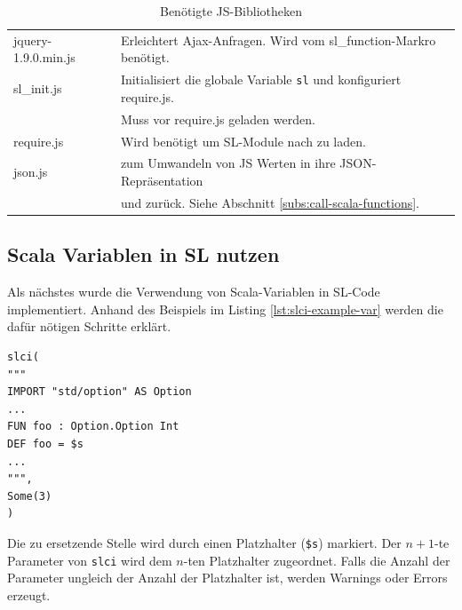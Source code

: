 \documentclass[12pt,bibtotoc]{scrreprt}
\begin{document}
\begin{table}[h]
\caption{Benötigte \ac{JS}-Bibliotheken}
\centering
\begin{tabular}{ll}
jquery-1.9.0.min.js & Erleichtert Ajax-Anfragen. Wird vom sl\_function-Markro benötigt\cite{JQuery1}.\\
sl\_init.js         & Initialisiert die globale Variable \lstinline!sl! und konfiguriert require.js. \\
                    & Muss vor require.js geladen werden.\\
require.js          & Wird benötigt um \ac{SL}-Module nach zu laden\cite{RequireJS1}.\\
json.js             & zum Umwandeln von JS Werten in ihre JSON-Repräsentation \\
                    & und zurück. Siehe Abschnitt \ref{subs:call-scala-functions}\cite{Crockford2010}.\\
\end{tabular}
\label{tab:js-libraries}
\end{table}

\subsection{Scala Variablen in SL nutzen}

Als nächstes wurde die Verwendung von Scala-Variablen in \ac{SL}-Code implementiert. Anhand des Beispiels im Listing \ref{lst:slci-example-var} werden die dafür nötigen Schritte erklärt.

\begin{lstlisting}[caption={Beispielaufruf des slci Macros mit Scala Variablen}, label=lst:slci-example-var, float=h]
slci(
"""
IMPORT "std/option" AS Option 
...
FUN foo : Option.Option Int
DEF foo = $s
...
""",
Some(3)
)
\end{lstlisting}

Die zu ersetzende Stelle wird durch einen Platzhalter (\lstinline!$s!) markiert. Der $n+1$-te Parameter von \lstinline!slci! wird dem $n$-ten Platzhalter zugeordnet. Falls die Anzahl der Parameter ungleich der Anzahl der Platzhalter ist, werden Warnings oder Errors erzeugt. 
\end{document}
